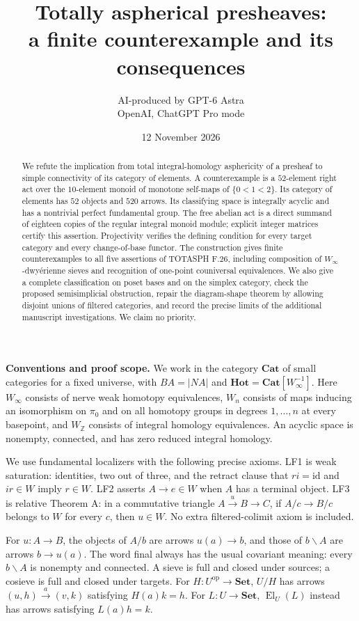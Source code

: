 \documentclass[11pt,a4paper]{article}
\title{Totally aspherical presheaves:\\a finite counterexample and its consequences}
\author{AI-produced by GPT-6 Astra\\OpenAI, ChatGPT Pro mode}
\date{12 November 2026}
\theoremstyle{definition}
\theoremstyle{remark}
\newcommand{\Cat}{\mathbf{Cat}}
\newcommand{\Set}{\mathbf{Set}}
\newcommand{\op}{\mathrm{op}}
\newcommand{\id}{\mathrm{id}}
\newcommand{\Winfty}{W_\infty}
\newcommand{\WZ}{W_{\mathbb Z}}
\newcommand{\El}{\operatorname{El}}
\newcommand{\Hot}{\mathbf{Hot}}
\begin{document}
\maketitle
\begin{abstract}
We refute the implication from total integral-homology asphericity of a presheaf to simple connectivity of its category of elements. A counterexample is a $52$-element right act over the $10$-element monoid of monotone self-maps of $\{0<1<2\}$. Its category of elements has $52$ objects and $520$ arrows. Its classifying space is integrally acyclic and has a nontrivial perfect fundamental group. The free abelian act is a direct summand of eighteen copies of the regular integral monoid module; explicit integer matrices certify this assertion. Projectivity verifies the defining condition for every target category and every change-of-base functor. The construction gives finite counterexamples to all five assertions of TOTASPH F.26, including composition of $\Winfty$-dwy\'erienne sieves and recognition of one-point couniversal equivalences. We also give a complete classification on poset bases and on the simplex category, check the proposed semisimplicial obstruction, repair the diagram-shape theorem by allowing disjoint unions of filtered categories, and record the precise limits of the additional manuscript investigations. We claim no priority.
\end{abstract}
\tableofcontents
\bigskip
\noindent\textbf{Conventions and proof scope.}
We work in the category $\Cat$ of small categories for a fixed universe, with $BA=|NA|$ and $\Hot=\Cat[\Winfty^{-1}]$. Here $\Winfty$ consists of nerve weak homotopy equivalences, $W_n$ consists of maps inducing an isomorphism on $\pi_0$ and on all homotopy groups in degrees $1,\ldots,n$ at every basepoint, and $\WZ$ consists of integral homology equivalences. An acyclic space is nonempty, connected, and has zero reduced integral homology.

We use fundamental localizers with the following precise axioms. LF1 is weak saturation: identities, two out of three, and the retract clause that $ri=\id$ and $ir\in W$ imply $r\in W$. LF2 asserts $A\to e\in W$ when $A$ has a terminal object. LF3 is relative Theorem A: in a commutative triangle $A\xrightarrow{u}B\to C$, if $A/c\to B/c$ belongs to $W$ for every $c$, then $u\in W$. No extra filtered-colimit axiom is included.

For $u:A\to B$, the objects of $A/b$ are arrows $u(a)\to b$, and those of $b\backslash A$ are arrows $b\to u(a)$. The word final always has the usual covariant meaning: every $b\backslash A$ is nonempty and connected. A sieve is full and closed under sources; a cosieve is full and closed under targets. For $H:U^{\op}\to\Set$, $U/H$ has arrows $(u,h)\xrightarrow{a}(v,k)$ satisfying $H(a)k=h$. For $L:U\to\Set$, $\El_U(L)$ instead has arrows satisfying $L(a)h=k$.
\end{document}
